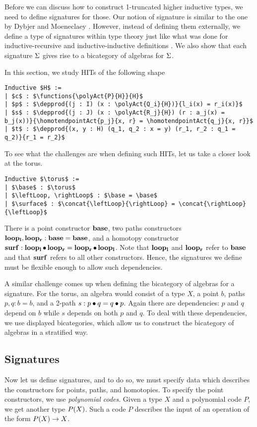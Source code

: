 Before we can discuss how to construct 1-truncated higher inductive types,
we need to define signatures for those.
Our notion of signature is similar to the one by Dybjer and Moeneclaey \cite{DBLP:journals/entcs/DybjerM18}.
However, instead of defining them externally, we define a type of signatures within type theory
just like what was done for inductive-recursive and inductive-inductive
definitions \cite{Dybjer1999AFA,forsberg2012finite}. 
We also show that each signature $\Sigma$ gives rise to a bicategory of algebras for $\Sigma$.

In this section, we study HITs of the following shape
\begin{lstlisting}[mathescape=true]
Inductive $H$ :=
| $c$ : $\functions{\polyAct{P}{H}}{H}$
| $p$ : $\depprod{(j : I) (x : \polyAct{Q_i}{H})}{l_i(x) = r_i(x)}$
| $s$ : $\depprod{(j : J) (x : \polyAct{R_j}{H}) (r : a_j(x) = b_j(x))}{\homotendpointAct{p_j}{x, r} = \homotendpointAct{q_j}{x, r}}$
| $t$ : $\depprod{(x, y : H) (q_1, q_2 : x = y) (r_1, r_2 : q_1 = q_2)}{r_1 = r_2}$
\end{lstlisting}
To see what the challenges are when defining such HITs, let us take a closer look at the torus.

\begin{lstlisting}[mathescape=true]
Inductive $\torus$ :=
| $\base$ : $\torus$
| $\leftLoop, \rightLoop$ : $\base = \base$
| $\surface$ : $\concat{\leftLoop}{\rightLoop} = \concat{\rightLoop}{\leftLoop}$
\end{lstlisting}

There is a point constructor $\operatorname{\mathbf{base}}$, two paths constructors $\operatorname{\mathbf{loop_l}}, \operatorname{\mathbf{loop_r}} : \operatorname{\mathbf{base}} = \operatorname{\mathbf{base}}$,
and a homotopy constructor $\operatorname{\mathbf{surf}} : \operatorname{\mathbf{loop_l}} \bullet \operatorname{\mathbf{loop_r}} = \operatorname{\mathbf{loop_r}} \bullet \operatorname{\mathbf{loop_l}}$.
Note that $\operatorname{\mathbf{loop_l}}$ and $\operatorname{\mathbf{loop_r}}$ refer to $\operatorname{\mathbf{base}}$ and that $\operatorname{\mathbf{surf}}$ refers to all other constructors.
Hence, the signatures we define must be flexible enough to allow such dependencies.

A similar challenge comes up when defining the bicategory of algebras for a signature.
For the torus, an algebra would consist of a type $X$, a point $b$, paths $p, q : b = b$, and a 2-path $s : p \bullet q = q \bullet p$.
Again there are dependencies: $p$ and $q$ depend on $b$ while $s$ depends on both $p$ and $q$.
To deal with these dependencies, we use displayed bicategories, which allow us to construct the bicategory of algebras in a stratified way.

\subsection{Signatures}\label{sec:signatures}
Now let us define signatures, and to do so, we must specify data which describes the constructors for points, paths, and homotopies.
To specify the point constructors, we use \emph{polynomial codes}.
Given a type $X$ and a polynomial code $P$, we get another type $P(X)$.
Such a code $P$ describes the input of an operation of the form $P(X) \rightarrow X$.

